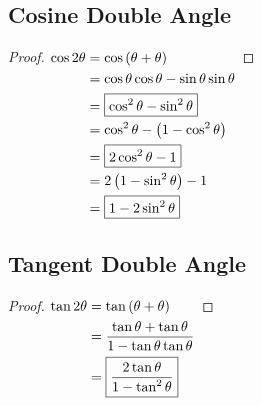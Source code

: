 \documentclass{article}
\begin{document}
\subsection{Cosine Double Angle}
\label{proof:cosdouble}
\begin{proof}
	$\begin{aligned}[t]
		\cos2\theta&=\cos\left(\theta+\theta\right) \\
		&=\cos\theta\cos\theta-\sin\theta\sin\theta \\
		&=\boxed{\cos^2\theta-\sin^2\theta} \\
		&=\cos^2\theta-\left(1-\cos^2\theta\right) \\
		&=\boxed{2\cos^2\theta-1} \\
		&=2\left(1-\sin^2\theta\right)-1 \\
		&=\boxed{1-2\sin^2\theta} \\
	\end{aligned} \\$
\end{proof}

\subsection{Tangent Double Angle}
\label{proof:tandouble}
\begin{proof}
	$\begin{aligned}[t]
		\tan2\theta&=\tan\left(\theta+\theta\right) \\
		&=\frac{\tan\theta+\tan\theta}{1-\tan\theta\tan\theta} \\
		&=\boxed{\frac{2\tan\theta}{1-\tan^2\theta}} \\
	\end{aligned} \\$
\end{proof}
\end{document}
